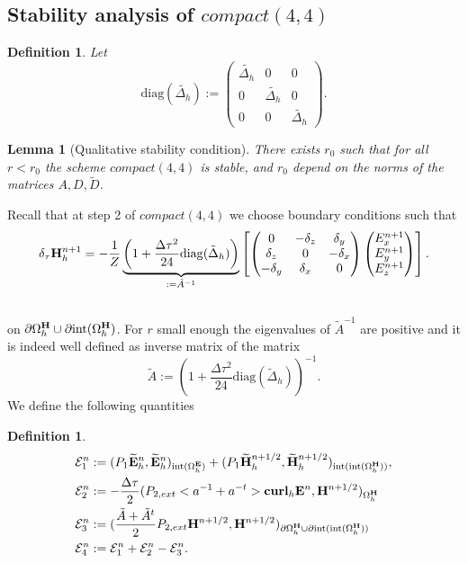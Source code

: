 \documentclass[12pt,reqno]{amsart}
\newcommand{\curl}{{\bf curl}}
\newcommand{\e}{{\bf E}}
\newcommand{\h}{{\bf H}}
\newtheorem{lem}[theorem]{Lemma}
\newtheorem{defi}[theorem]{Definition}
\theoremstyle{definition}
\numberwithin{equation}{section}
\newcommand{\intr}[1]{\mathrm{int}(#1)}
\def\Gwh{\Omega_h}
\begin{document}
\subsection{Stability analysis of $compact(4,4)$ }
\begin{defi}
	Let $$
	\mathrm{diag}(\tilde{\Delta_h}):=
	\begin{pmatrix}
	\tilde{\Delta_h} &0 &0 \\
	0& \tilde{\Delta_h}&0\\
	0&0&\tilde{\Delta_h}
	\end{pmatrix}.
	$$
\end{defi}
\begin{lem}[Qualitative stability condition]\label{lem:stab_44}
There exists $r_0$ such that for all $r<r_0$ the scheme $compact(4,4)$ is stable, and
$r_0$ depend on the norms of the matrices $A,D,\tilde{D}$.
\end{lem}
Recall that at  step 2 of $compact(4,4)$ we choose boundary conditions  such that
\begin{align*}
	&
	\delta_{\tau}\h_h^{n+1}=
-\frac{1}{Z}
	\underbrace{\left(
		1+\frac{\Delta \tau^2}{24}\mathrm{diag}(\tilde{\Delta}_h)
		\right)}_{:=\tilde{A}^{-1}}	\left[ 
	\begin{pmatrix}
	0& -\delta_z & \delta _y\\
	\delta_z&0&-\delta_x\\
	-\delta_y&\delta_x&0\\
\end{pmatrix}
\begin{pmatrix}
E_x^{n+1}\\
E_y^{n+1}\\
E_z^{n+1}
\end{pmatrix}\right] .\\&
\end{align*} on $\partial\Gwh^\h\cup \partial \intr{\Gwh^\h}$.
For $r$ small enough the eigenvalues of $\tilde{A}^{-1}$ are positive and it is indeed well defined as inverse matrix of the matrix 
$$
\tilde{A}:=\left (  1+\frac{\Delta \tau^2}{24}\mathrm{diag}(\tilde{\Delta}_h) \right)^{-1}.
$$
	We define the following quantities
\begin{defi}
	\begin{align*}
		&
		\mathcal{E}_1^{n}:=
		(P_1\widetilde{\e}_h^{n},\widetilde{\e}_h^{n})_{\intr{\Gwh^\e}}+
		(P_1\widetilde{\h}_h^{n+1/2},\widetilde{\h}_h^{n+1/2})_{\intr{\intr{\Gwh^\h}}}, \\&
		\mathcal{E}_2^{n}:=-\frac{\Delta \tau}{2}(P_{2,ext}<a^{-1}+a^{-t}>\curl_h \e^{n},\h^{n+1/2})_{\Gwh^\h}\\&
		\mathcal{E}_3^{n}:=(\frac{\tilde{A}+\tilde{A}^t}{2}P_{2,ext}\h^{n+1/2},\h^{n+1/2})_{\partial \Gwh^\h\cup \partial \intr{\intr{\Gwh^\h}}}\\&
		\mathcal{E}_4^{n}:=\mathcal{E}^n_1+\mathcal{E}^n_2-\mathcal{E}^n_3.
	\end{align*}
\end{defi}
\end{document}
